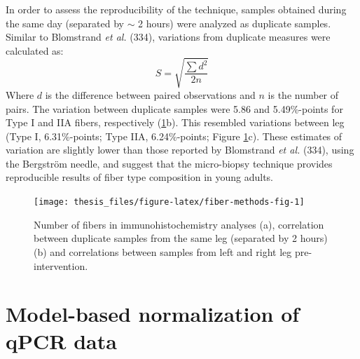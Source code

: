 \documentclass[twoside,10pt]{gihclass} %
\begin{document}
In order to assess the reproducibility of the technique, samples obtained during the same day (separated by \(\sim\) 2 hours) were analyzed as duplicate samples.
Similar to Blomstrand \emph{et al.} (334), variations from duplicate measures were calculated as:
\[S = \sqrt{\frac{\sum{d^2}}{2n}}\]
Where \(d\) is the difference between paired observations and \(n\) is the number of pairs.
The variation between duplicate samples were 5.86 and 5.49\%-points for Type I and IIA fibers, respectively (\ref{fig:fiber-methods-fig}b).
This resembled variations between leg (Type I, 6.31\%-points; Type IIA, 6.24\%-points; Figure \ref{fig:fiber-methods-fig}c).
These estimates of variation are slightly lower than those reported by Blomstrand \emph{et al.} (334), using the Bergström needle, and suggest that the micro-biopsy technique provides reproducible results of fiber type composition in young adults.
\begin{figure}

{\centering \texttt{[image: thesis\_files/figure-latex/fiber-methods-fig-1]} 

}

\caption[Characteristics of biopsy samples used in immunohistochemistry analyses.]{Number of fibers in immunohistochemistry analyses (a), correlation between duplicate samples from the same leg (separated by 2 hours) (b) and correlations between samples from left and right leg pre-intervention.}\label{fig:fiber-methods-fig}
\end{figure}
\hypertarget{model-based-normalization-of-qpcr-data}{%
\section{Model-based normalization of qPCR data}\label{model-based-normalization-of-qpcr-data}}
\end{document}
